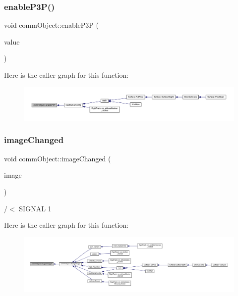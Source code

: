 \mbox{\label{classcomm_object_a7552116eb5e18c49c6dcf943de29af7a}} 
\subsubsection{enable\+P3\+P()}
{\footnotesize\ttfamily void comm\+Object\+::enable\+P3P (\begin{DoxyParamCaption}\item[{bool}]{value }\end{DoxyParamCaption})}

Here is the caller graph for this function\+:\nopagebreak
\begin{figure}[H]
\begin{center}
\leavevmode
\includegraphics[width=350pt]{classcomm_object_a7552116eb5e18c49c6dcf943de29af7a_icgraph}
\end{center}
\end{figure}
\mbox{\label{classcomm_object_a3828eab6be234f6216a6f80a6a82e41e}} 
\subsubsection{image\+Changed}
{\footnotesize\ttfamily void comm\+Object\+::image\+Changed (\begin{DoxyParamCaption}\item[{Q\+Pixmap}]{image }\end{DoxyParamCaption})\hspace{0.3cm}{\ttfamily [signal]}}



/$<$ S\+I\+G\+N\+AL 1 

Here is the caller graph for this function\+:\nopagebreak
\begin{figure}[H]
\begin{center}
\leavevmode
\includegraphics[width=350pt]{classcomm_object_a3828eab6be234f6216a6f80a6a82e41e_icgraph}
\end{center}
\end{figure}
\mbox{\label{classcomm_object_a72620fe1bac16309baf6d148644edaf9}} 
